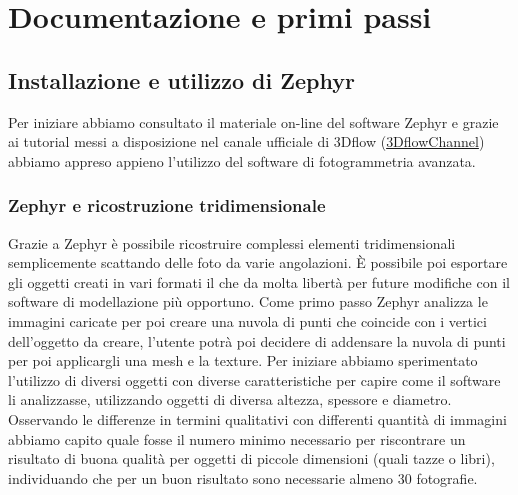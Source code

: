 \documentclass[12pt]{report}
\begin{document}
\chapter{Documentazione e primi passi}
\section{Installazione e utilizzo di Zephyr}
Per iniziare abbiamo consultato il materiale on-line del software Zephyr e grazie ai tutorial messi a disposizione nel canale ufficiale di 3Dflow (\href{https://www.youtube.com/user/3DflowChannel}{3DflowChannel}) abbiamo appreso appieno l'utilizzo del software di fotogrammetria avanzata.


\subsection {Zephyr e ricostruzione tridimensionale}
Grazie a Zephyr \`e possibile ricostruire complessi elementi tridimensionali semplicemente scattando delle foto da varie angolazioni. \`E possibile poi esportare gli oggetti creati in vari formati il che da molta libert\`a per future modifiche con il software di modellazione pi\`u opportuno.
Come primo passo Zephyr analizza le immagini caricate per poi creare una nuvola di punti che coincide con i vertici dell'oggetto da creare, l'utente potr\`a poi decidere di addensare la nuvola di punti per poi applicargli una mesh e la texture.
Per iniziare abbiamo sperimentato l'utilizzo di diversi oggetti con diverse caratteristiche per capire come il software li analizzasse, utilizzando oggetti di diversa altezza, spessore e diametro. Osservando le differenze in termini qualitativi con differenti quantit\`a di immagini abbiamo capito quale fosse il numero minimo necessario per riscontrare un risultato di buona qualit\`a per oggetti di piccole dimensioni (quali tazze o libri), individuando che per un buon risultato sono necessarie almeno 30 fotografie.
\end{document}
